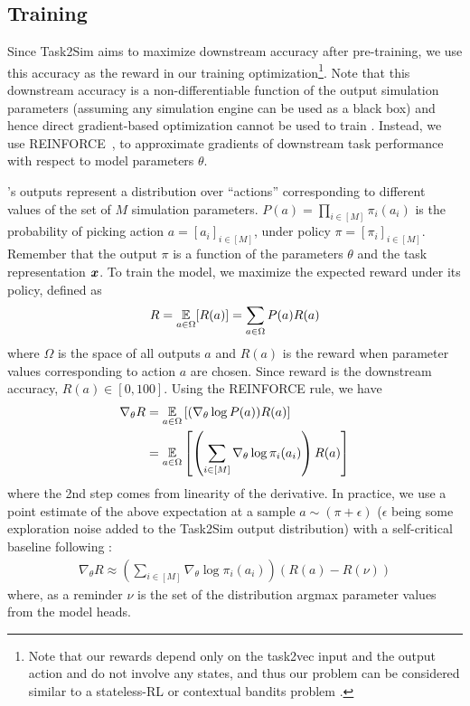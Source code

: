 \subsection{\ours Training} 


Since Task2Sim aims to maximize downstream accuracy after pre-training, we use this accuracy as the reward in our training optimization\footnote{Note that our rewards depend only on the task2vec input and the output action and do not involve any states, and thus our problem can be considered similar to a stateless-RL or contextual bandits problem \cite{langford2007epoch}.}.
Note that this downstream accuracy is a non-differentiable function of the output simulation parameters (assuming any simulation engine can be used as a black box) and hence direct gradient-based optimization cannot be used to train \ours. Instead, we use REINFORCE~\cite{williams1992simple}, to approximate gradients of downstream task performance with respect to model parameters $\theta$. 

\ours's outputs represent a distribution over ``actions'' corresponding to different values of the set of $M$ simulation parameters. $P(a) = \prod_{i \in [M]} \pi_i(a_i)$ is the probability of picking action $a = [a_i]_{i \in [M]}$, under policy $\pi = [\pi_i]_{i \in [M]}$. Remember that the output $\pi$ is a function of the parameters $\theta$ and the task representation $\boldsymbol{x}$. To train the model, we maximize the expected reward under its policy, defined as
\begin{align}
    R = \operatorname*{\mathbb{E}}_{a \in \Omega}[R(a)] = \sum_{a \in \Omega} P(a) R(a)
\end{align}
where $\Omega$ is the space of all outputs $a$ and $R(a)$ is the reward when parameter values corresponding to action $a$ are chosen. Since reward is the downstream accuracy, $R(a) \in [0, 100]$.  
Using the REINFORCE rule, we have
\begin{align}
    \nabla_{\theta} R 
    &= \operatorname*{\mathbb{E}}_{a \in \Omega} \left[ (\nabla_{\theta} \log P(a)) R(a) \right] \\
    &= \operatorname*{\mathbb{E}}_{a \in \Omega} \left[ \left(\sum_{i \in [M]} \nabla_{\theta} \log \pi_i(a_i) \right) R(a) \right]
\end{align}
where the 2nd step comes from linearity of the derivative. In practice, we use a point estimate of the above expectation at a sample $a \sim (\pi + \epsilon)$ ($\epsilon$ being some exploration noise added to the Task2Sim output distribution) with a self-critical baseline following \cite{rennie2017self}:
\begin{align} \label{eq:grad-pt-est}
    \nabla_{\theta} R \approx \left(\sum_{i \in [M]} \nabla_{\theta} \log \pi_i(a_i) \right) \left( R(a) - R(\nu) \right) 
\end{align}
where, as a reminder $\nu$ is the set of the distribution argmax parameter values from the \name{} model heads.

